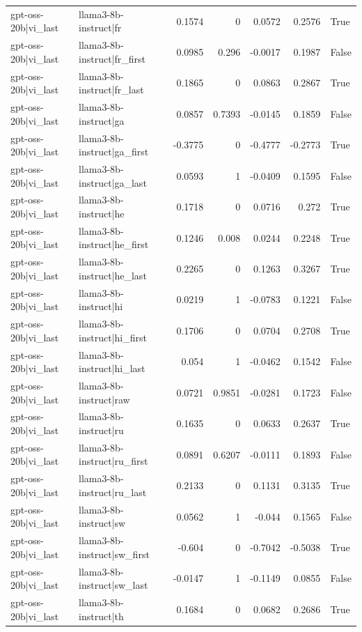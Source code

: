 \begin{table}
\begin{tabular}{l l r r r r l}
gpt-oss-20b|vi_last & llama3-8b-instruct|fr & 0.1574 & 0 & 0.0572 & 0.2576 & True \\
gpt-oss-20b|vi_last & llama3-8b-instruct|fr_first & 0.0985 & 0.296 & -0.0017 & 0.1987 & False \\
gpt-oss-20b|vi_last & llama3-8b-instruct|fr_last & 0.1865 & 0 & 0.0863 & 0.2867 & True \\
gpt-oss-20b|vi_last & llama3-8b-instruct|ga & 0.0857 & 0.7393 & -0.0145 & 0.1859 & False \\
gpt-oss-20b|vi_last & llama3-8b-instruct|ga_first & -0.3775 & 0 & -0.4777 & -0.2773 & True \\
gpt-oss-20b|vi_last & llama3-8b-instruct|ga_last & 0.0593 & 1 & -0.0409 & 0.1595 & False \\
gpt-oss-20b|vi_last & llama3-8b-instruct|he & 0.1718 & 0 & 0.0716 & 0.272 & True \\
gpt-oss-20b|vi_last & llama3-8b-instruct|he_first & 0.1246 & 0.008 & 0.0244 & 0.2248 & True \\
gpt-oss-20b|vi_last & llama3-8b-instruct|he_last & 0.2265 & 0 & 0.1263 & 0.3267 & True \\
gpt-oss-20b|vi_last & llama3-8b-instruct|hi & 0.0219 & 1 & -0.0783 & 0.1221 & False \\
gpt-oss-20b|vi_last & llama3-8b-instruct|hi_first & 0.1706 & 0 & 0.0704 & 0.2708 & True \\
gpt-oss-20b|vi_last & llama3-8b-instruct|hi_last & 0.054 & 1 & -0.0462 & 0.1542 & False \\
gpt-oss-20b|vi_last & llama3-8b-instruct|raw & 0.0721 & 0.9851 & -0.0281 & 0.1723 & False \\
gpt-oss-20b|vi_last & llama3-8b-instruct|ru & 0.1635 & 0 & 0.0633 & 0.2637 & True \\
gpt-oss-20b|vi_last & llama3-8b-instruct|ru_first & 0.0891 & 0.6207 & -0.0111 & 0.1893 & False \\
gpt-oss-20b|vi_last & llama3-8b-instruct|ru_last & 0.2133 & 0 & 0.1131 & 0.3135 & True \\
gpt-oss-20b|vi_last & llama3-8b-instruct|sw & 0.0562 & 1 & -0.044 & 0.1565 & False \\
gpt-oss-20b|vi_last & llama3-8b-instruct|sw_first & -0.604 & 0 & -0.7042 & -0.5038 & True \\
gpt-oss-20b|vi_last & llama3-8b-instruct|sw_last & -0.0147 & 1 & -0.1149 & 0.0855 & False \\
gpt-oss-20b|vi_last & llama3-8b-instruct|th & 0.1684 & 0 & 0.0682 & 0.2686 & True \\

\end{tabular}
\end{table}
